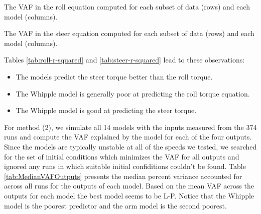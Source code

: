 \documentclass[a4paper]{article}
\begin{document}
\begin{table}
  \caption{The VAF in the roll equation computed for each subset of data (rows)
  and each model (columns).}
  \label{tab:roll-r-squared}
  \tiny
  
\end{table}

\begin{table}
  \caption{The VAF in the steer equation computed for each subset of data (rows)
  and each model (columns).}
  \label{tab:steer-r-squared}
  \tiny
  
\end{table}

Tables \ref{tab:roll-r-squared} and \ref{tab:steer-r-squared} lead to these
observations:

\begin{itemize}
  \item
    The models predict the steer torque better than the roll torque.
  \item
    The Whipple model is generally poor at predicting the roll torque equation.
  \item
    The Whipple model is good at predicting the steer torque.
\end{itemize}



For method (2), we simulate all 14 models with the inputs measured from the 374
runs and compute the VAF explained by the model for each of the four outputs.
Since the models are typically unstable at all of the speeds we tested, we
searched for the set of initial conditions which minimizes the VAF for all
outputs and ignored any runs in which suitable initial confiditions couldn't be
found. Table \ref{tab:MedianVAFOutputs} presents the median percent variance
accounted for across all runs for the outputs of each model. Based on the mean
VAF across the outputs for each model the best model seems to be L-P. Notice
that the Whipple model is the poorest predictor and the arm model is the second
poorest.
\end{document}
